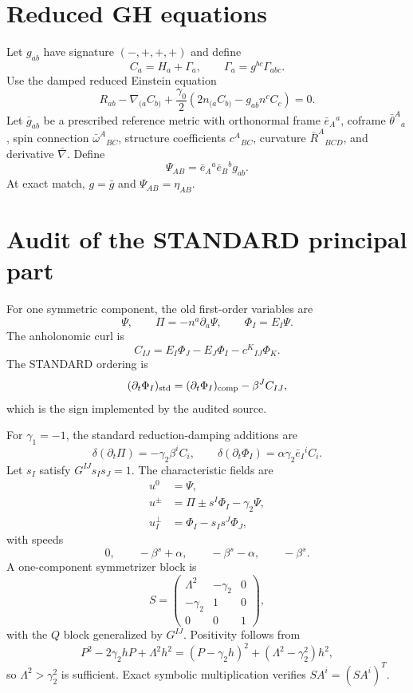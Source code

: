 \documentclass[11pt]{article}
\newcommand{\bg}{\bar g}
\newcommand{\bn}{\bar\nabla}
\newcommand{\be}{\bar e}
\newcommand{\bt}{\bar\theta}
\newcommand{\bw}{\bar\omega}
\newcommand{\bR}{\bar R}
\begin{document}
\section{Reduced GH equations}
Let $g_{ab}$ have signature $(-,+,+,+)$ and define
\[
C_a=H_a+\Gamma_a,\qquad \Gamma_a=g^{bc}\Gamma_{abc}.
\]
Use the damped reduced Einstein equation
\begin{equation}
R_{ab}-\nabla_{(a}C_{b)}+\frac{\gamma_0}{2}
\left(2n_{(a}C_{b)}-g_{ab}n^cC_c\right)=0.
\label{eq:reduced}
\end{equation}
Let $\bg_{ab}$ be a prescribed reference metric with orthonormal frame $\be_A{}^a$, coframe $\bt^A{}_a$, spin connection $\bw^A{}_{BC}$, structure coefficients $c^A{}_{BC}$, curvature $\bR^A{}_{BCD}$, and derivative $\bn$. Define
\[
\Psi_{AB}=\be_A{}^a\be_B{}^b g_{ab}.
\]
At exact match, $g=\bg$ and $\Psi_{AB}=\eta_{AB}$.

\section{Audit of the STANDARD principal part}
For one symmetric component, the old first-order variables are
\[
\Psi,\qquad \Pi=-n^a\partial_a\Psi,\qquad \Phi_I=E_I\Psi.
\]
The anholonomic curl is
\[
C_{IJ}=E_I\Phi_J-E_J\Phi_I-c^K{}_{IJ}\Phi_K.
\]
The STANDARD ordering is
\begin{equation}
(\partial_t\Phi_I)_{\rm std}=(\partial_t\Phi_I)_{\rm comp}-\beta^J C_{IJ},
\label{eq:standard}
\end{equation}
which is the sign implemented by the audited source.

For $\gamma_1=-1$, the standard reduction-damping additions are
\[
\delta(\partial_t\Pi)=-\gamma_2\beta^iC_i,
\qquad
\delta(\partial_t\Phi_I)=\alpha\gamma_2\be_I{}^i C_i.
\]
Let $s_I$ satisfy $G^{IJ}s_Is_J=1$. The characteristic fields are
\begin{align}
u^0&=\Psi,\\
u^\pm&=\Pi\pm s^I\Phi_I-\gamma_2\Psi,\\
u_I^\perp&=\Phi_I-s_I s^J\Phi_J,
\end{align}
with speeds
\[
0,\qquad -\beta^s+\alpha,\qquad -\beta^s-\alpha,\qquad -\beta^s.
\]
A one-component symmetrizer block is
\begin{equation}
S=\begin{pmatrix}
\Lambda^2&-\gamma_2&0\\
-\gamma_2&1&0\\
0&0&1
\end{pmatrix},
\label{eq:Sblock}
\end{equation}
with the $Q$ block generalized by $G^{IJ}$. Positivity follows from
\[
P^2-2\gamma_2hP+\Lambda^2h^2=(P-\gamma_2h)^2+(\Lambda^2-\gamma_2^2)h^2,
\]
so $\Lambda^2>\gamma_2^2$ is sufficient. Exact symbolic multiplication verifies $SA^i=(SA^i)^T$.
\end{document}
